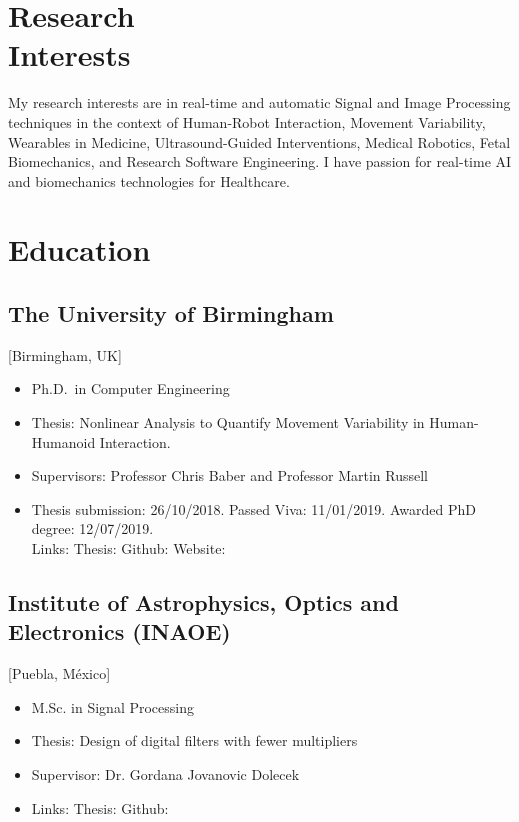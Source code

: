 \documentclass{mycv}
\begin{document}
\maketitle

\section{Research \\ Interests}
My research interests are in real-time and automatic Signal and Image Processing techniques in the context of Human-Robot Interaction, Movement Variability, Wearables in Medicine, Ultrasound-Guided Interventions, Medical Robotics, Fetal Biomechanics, and Research Software Engineering.
I have passion for real-time AI and biomechanics technologies for Healthcare.

\section{Education}
\subsection{The University of Birmingham}[Birmingham, UK]
\vspace{-\parskip}%
\begin{itemize}[label={}]
  \item Ph.D.\ in Computer Engineering 
  \item Thesis: Nonlinear Analysis to Quantify Movement Variability in Human-Humanoid Interaction.   
  \item Supervisors: Professor Chris Baber and  Professor Martin Russell
  \item	Thesis submission: 26/10/2018. Passed Viva: 11/01/2019. Awarded PhD degree: 12/07/2019. \\
	Links: Thesis: \href{https://doi.org/10.5281/zenodo.3384145}{\faFilePdfO}
	Github: \href{http://doi.org/10.5281/zenodo.3384281}{\faGithubAlt}
	Website: \href{https://mxochicale-phd.github.io/site/}{\faExternalLink} 
\end{itemize}

\subsection{Institute of Astrophysics, Optics and Electronics (INAOE)}[Puebla, M\'exico]
\vspace{-\parskip}%
\begin{itemize}[label={}]
  \item M.Sc. in Signal Processing 
  \item Thesis: Design of digital filters with fewer multipliers
  \item Supervisor: Dr. Gordana Jovanovic Dolecek
  \item	Links: 
	Thesis: \href{https://github.com/mxochicale/publications/blob/master/thesis/M.Sc./doc/MPXochicale_MScThesis-2016.pdf}{\faFilePdfO}
	Github: \href{https://github.com/mxochicale/publications/tree/master/thesis/M.Sc.}{\faGithubAlt}
\end{itemize}
\end{document}

